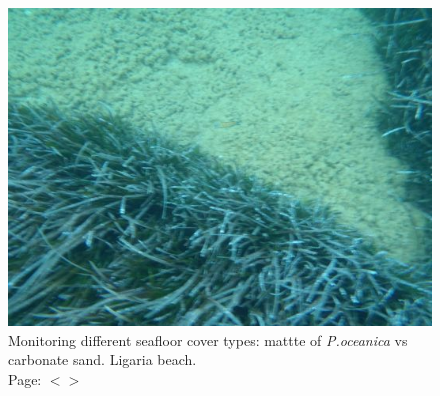 \documentclass[11pt]{article}
\begin{document}
\begin{appendices}
\begin{figure}[H]
	\centering
	\includegraphics[scale=0.4]{photo-4.jpg}
	\caption{Monitoring different seafloor cover types: mattte of \textit{P.oceanica} vs carbonate sand. Ligaria beach. \\ Page: $<$\pageref{page-27}$>$}
	\label{fig:A.56}
\end{figure}

\end{appendices}
\pagebreak
\clearpage
\end{document}
